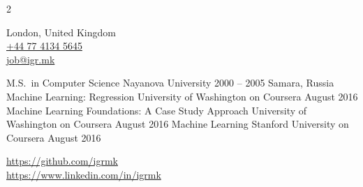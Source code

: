 \documentclass[9pt,a4paper]{igrmkcv}
\begin{document}
\begin{paracol}{2}
\newpage
\switchcolumn

    London, United Kingdom\\
    \href{tel:+447741345645}{+44 77 4134 5645}\\
    \href{mailto:job@igr.mk}{job@igr.mk}


    \vspace{8pt}

    \cvRightEvent
        {M.S.\ in Computer Science}
        {Nayanova University}
        {2000 -- 2005}
        {Samara, Russia}
    \cvRightEvent
        {Machine Learning: Regression}
        {University of Washington on Coursera}
        {August 2016}
        {}
    \cvRightEvent
        {Machine Learning Foundations: A Case Study Approach}
        {University of Washington on Coursera}
        {August 2016}
        {}
    \cvRightEvent
        {Machine Learning}
        {Stanford University on Coursera}
        {August 2016}
        {}


\href{https://github.com/igrmk}{https://github.com/igrmk}\\
\href{https://www.linkedin.com/in/igrmk}{https://www.linkedin.com/in/igrmk}

\end{paracol}
\end{document}

